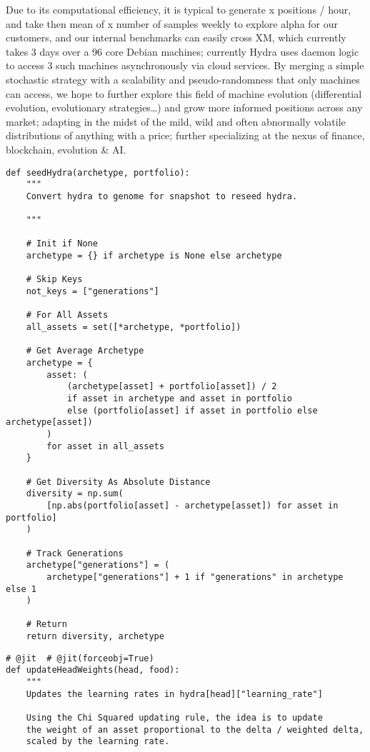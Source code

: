 \documentclass[11pt, a4paper]{awesome-cv}
\begin{document}
\begin{cvletter}
Due to its computational efficiency, it is typical to generate x positions / hour, and take then mean of x number of samples weekly to explore alpha for our customers, and our internal benchmarks can easily cross XM, which currently takes 3 days over a 96 core Debian machines; currently Hydra uses daemon logic to access 3 such machines asynchronously via cloud services.
By merging a simple stochastic strategy with a scalability and pseudo-randomness that only machines can access, we hope to further explore this field of machine evolution (differential evolution, evolutionary strategies\ldots{}) and grow more informed positions across any market; adapting in the midst of the mild, wild and often abnormally volatile distributions of anything with a price; further specializing at the nexus of finance, blockchain, evolution \& AI.


\begin{verbatim}
def seedHydra(archetype, portfolio):
    """
    Convert hydra to genome for snapshot to reseed hydra.

    """

    # Init if None
    archetype = {} if archetype is None else archetype

    # Skip Keys
    not_keys = ["generations"]

    # For All Assets
    all_assets = set([*archetype, *portfolio])

    # Get Average Archetype
    archetype = {
        asset: (
            (archetype[asset] + portfolio[asset]) / 2
            if asset in archetype and asset in portfolio
            else (portfolio[asset] if asset in portfolio else archetype[asset])
        )
        for asset in all_assets
    }

    # Get Diversity As Absolute Distance
    diversity = np.sum(
        [np.abs(portfolio[asset] - archetype[asset]) for asset in portfolio]
    )

    # Track Generations
    archetype["generations"] = (
        archetype["generations"] + 1 if "generations" in archetype else 1
    )

    # Return
    return diversity, archetype
\end{verbatim}

\begin{verbatim}
# @jit  # @jit(forceobj=True)
def updateHeadWeights(head, food):
    """
    Updates the learning rates in hydra[head]["learning_rate"]

    Using the Chi Squared updating rule, the idea is to update
    the weight of an asset proportional to the delta / weighted delta,
    scaled by the learning rate.


\end{verbatim}
\end{cvletter}
\end{document}
